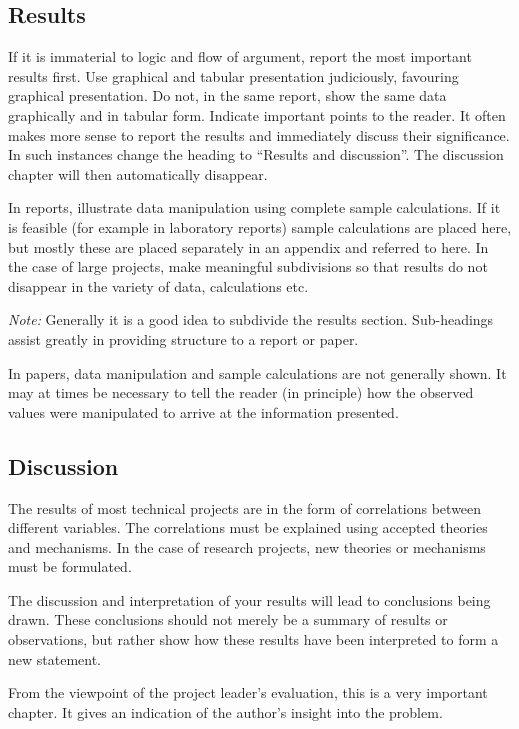 \documentclass[a5paper, 10pt]{article}
\begin{document}
\subsection{Results}
\label{sec:results}
If it is immaterial to logic and flow of argument, report the most
important results first.  Use graphical and tabular presentation
judiciously, favouring graphical presentation.  Do not, in the same
report, show the same data graphically and in tabular form.  Indicate
important points to the reader.  It often makes more sense to report
the results and immediately discuss their significance.  In such
instances change the heading to ``Results and discussion''. The
discussion chapter will then automatically disappear.

In reports, illustrate data manipulation using complete sample
calculations.  If it is feasible (for example in laboratory reports)
sample calculations are placed here, but mostly these are placed
separately in an appendix and referred to here.  In the case of large
projects, make meaningful subdivisions so that results do not
disappear in the variety of data, calculations etc.

\emph{Note:} Generally it is a good idea to subdivide the results section.
Sub-headings assist greatly in providing structure to a report or
paper.

In papers, data manipulation and sample calculations are not generally
shown.  It may at times be necessary to tell the reader (in principle)
how the observed values were manipulated to arrive at the information
presented.

\subsection{Discussion}
\label{sec:discussion}
The results of most technical projects are in the form of correlations
between different variables.  The correlations must be explained using
accepted theories and mechanisms.  In the case of research projects,
new theories or mechanisms must be formulated.

The discussion and interpretation of your results will lead to
conclusions being drawn.  These conclusions should not merely be a
summary of results or observations, but rather show how these results
have been interpreted to form a new statement.

From the viewpoint of the project leader's evaluation, this is a very
important chapter.  It gives an indication of the author's insight
into the problem.
\end{document}
